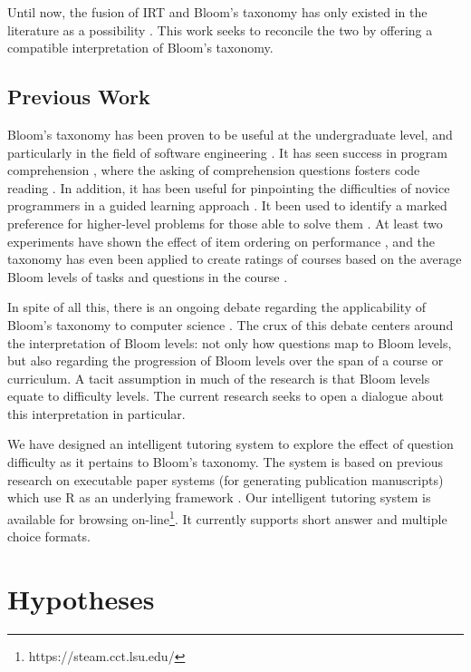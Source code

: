 \documentclass[]{interact}
\theoremstyle{plain}
\theoremstyle{definition}
\theoremstyle{remark}
\begin{document}
Until now, the fusion of IRT and Bloom's taxonomy has only existed in the
literature as a possibility \citep{sitthisak}.  This work seeks to reconcile
the two by offering a compatible interpretation of Bloom's taxonomy.

\subsection{Previous Work}

Bloom's taxonomy has been proven to be useful at the undergraduate level, and
particularly in the field of software engineering \citep{britto2015,
mahmood2014}.  It has seen success in program comprehension
\citep{buckley2003}, where the asking of comprehension questions fosters code
reading \citep{losada2008}. In addition, it has been useful for pinpointing the
difficulties of novice programmers in a guided learning approach
\citep{shuhidan2011}.  It been used to identify a marked preference for
higher-level problems for those able to solve them \citep{bruyn2011}
\citep{goel2004}.  At least two experiments have shown the effect of item
ordering on performance \citep{newman1988effect,castleberry2016effect}, and the
taxonomy has even been applied to create ratings of courses based on the
average Bloom levels of tasks and questions in the course
\citep{oliver2004course}.

In spite of all this, there is an ongoing debate regarding the applicability of
Bloom's taxonomy to computer science \citep{johnson2006bloom,
fuller2007developing, thompson2008bloom}.  The crux of this debate centers
around the interpretation of Bloom levels: not only how questions map to Bloom
levels, but also regarding the progression of Bloom levels over the span of a
course or curriculum.  A tacit assumption in much of the research is that Bloom
levels equate to difficulty levels.  The current research seeks to open a
dialogue about this interpretation in particular.

We have designed an intelligent tutoring system to explore the effect of
question difficulty as it pertains to Bloom's taxonomy.  The system is based on
previous research on executable paper systems (for generating publication
manuscripts) which use R as an underlying framework \citep{castleberry2011}.
Our intelligent tutoring system is available for browsing
on-line\footnote{https://steam.cct.lsu.edu/}. It currently supports short
answer and multiple choice formats.

\section{Hypotheses}
\end{document}

